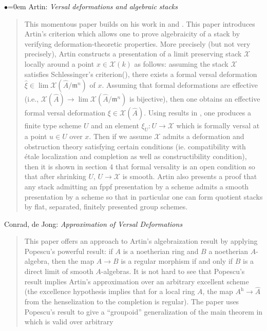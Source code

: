 \begin{list}{$\bullet$}{\leftmargin=0em}
Artin: \emph{Versal deformations and algebraic stacks} \cite{ArtinVersal}
\begin{quote}
This momentous paper builds on his work in
\cite{Artin-Algebraic-Approximation} and \cite{ArtinI}. This paper
introduces Artin's criterion which allows one to prove algebraicity of a
stack by  verifying deformation-theoretic properties. More precisely (but
not very  precisely), Artin constructs a presentation of a limit preserving
stack  $\mathcal{X}$
locally around a point $x \in \mathcal{X}(k)$ as follows: assuming the stack
$\mathcal{X}$
satisfies Schlessinger's criterion(\cite{Sch}), there exists a formal
versal deformation
$\hat{\xi} \in \lim \mathcal{X}(\hat A / \mathfrak m^n)$ of
$x$. Assuming  that formal deformations are effective (i.e.,
$\mathcal{X}(\hat{A}) \to \lim \mathcal{X}(\hat A  / \mathfrak m^n)$
is bijective), then one obtains an effective formal versal
deformation $\xi \in \mathcal{X}(\hat A)$. Using results in
\cite{ArtinI}, one produces a finite type scheme $U$ and an
element $\xi_U: U \to \mathcal{X}$ which is formally versal at a point
$u \in U$ over $x$. Then if we assume $\mathcal{X}$ admits a deformation
and obstruction theory
satisfying certain conditions (ie. compatibility with \'etale localization and
completion as well as constructibility condition), then it is shown in section
4 that formal versality is an open condition so that after shrinking $U$, $U
\to \mathcal{X}$ is smooth.
Artin also presents a proof that any stack admitting an fppf presentation by
a scheme admits a smooth presentation by a scheme so that in particular
one can form quotient stacks by flat, separated, finitely presented group
schemes.
\end{quote}
\smallskip
\item Conrad, de Jong: \emph{Approximation of Versal Deformations}
\cite{conrad-dejong}
\begin{quote}
This paper offers an approach to Artin's algebraization result by applying
Popescu's powerful result: if $A$ is a noetherian ring and $B$ a noetherian
$A$-algebra, then the map $A \to B$ is a regular morphism if and only if $B$
is a direct limit of smooth $A$-algebras. It is not hard to see that Popescu's
result implies Artin's approximation over an arbitrary excellent scheme (the
excellence hypothesis implies that for a local ring $A$, the map $A^{\text{h}}
\to \hat A$ from the henselization to the completion is regular).
The paper uses Popescu's result to give a ``groupoid'' generalization of the
main theorem in \cite{ArtinI} which is valid over arbitrary

\end{quote}
\end{list}
